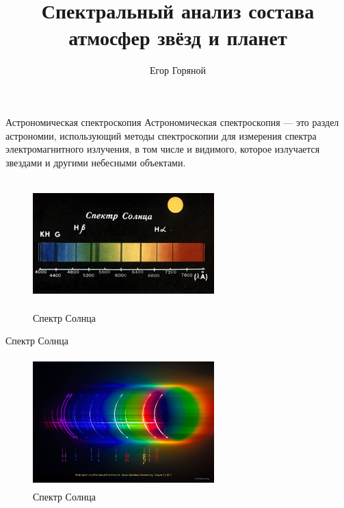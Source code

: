 \documentclass[
]{beamer}
\title{Спектральный анализ состава атмосфер звёзд и планет}
\author[]{Егор Горяной}
\begin{document}
	
	\begin{frame}[plain]
		\maketitle
	\end{frame}
	\begin{frame}{Астрономическая спектроскопия}
		Астрономическая спектроскопия — это раздел астрономии, использующий методы спектроскопии для измерения спектра электромагнитного излучения, в том числе и видимого, которое излучается звездами и другими небесными объектами.
		\begin{figure}[H]
			\centering
			\includegraphics[width=7cm, height=5cm]{Спектр_солнца.jpg}
			\caption{Спектр Солнца}
		\end{figure}
	\end{frame}

	\begin{frame}{Спектр Солнца}
		\begin{figure}[H]
			\centering
			\includegraphics[width=7cm, height=5cm]{flash_spec.jpg}
			\caption{Спектр Солнца}
		\end{figure}
	\end{frame}
\end{document}
